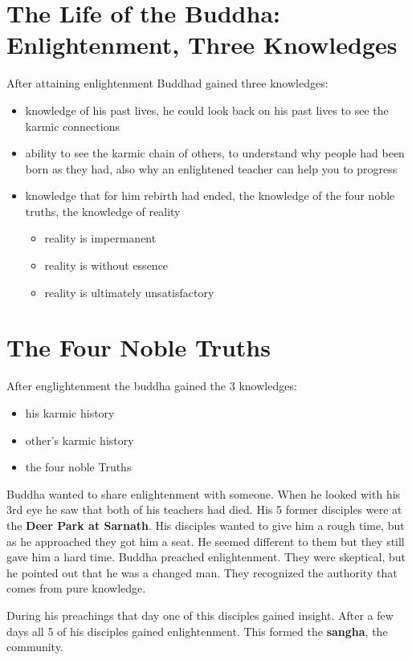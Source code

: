\documentclass{article}
\begin{document}
\section*{The Life of the Buddha: Enlightenment, Three Knowledges}
\label{sec:the_life_of_the_buddha_enlightenment_three_knowledges}
After attaining enlightenment Buddhad gained three knowledges:
\begin{itemize}
	\item knowledge of his past lives, he could look back on his past lives to see the karmic connections
	\item ability to see the karmic chain of others, to understand why people had been born as they had, also why an enlightened teacher can help you to progress
	\item knowledge that for him rebirth had ended, the knowledge of the four noble truths, the knowledge of reality
	\begin{itemize}
		\item reality is impermanent
		\item reality is without essence
		\item reality is ultimately unsatisfactory
	\end{itemize}
\end{itemize}

\section*{The Four Noble Truths}
\label{sec:the_four_nobel_truths}
After englightenment the buddha gained the 3 knowledges:
\begin{itemize}
	\item his karmic history
	\item other's karmic history
	\item the four noble Truths
\end{itemize}

Buddha wanted to share enlightenment with someone. When he looked with his 3rd eye he saw that both of his teachers had died. His 5 former disciples were at the \textbf{Deer Park at Sarnath}. His disciples wanted to give him a rough time, but as he approached they got him a seat. He seemed different to them but they still gave him a hard time. Buddha preached enlightenment. They were skeptical, but he pointed out that he was a changed man. They recognized the authority that comes from pure knowledge.

During his preachings that day one of this disciples gained insight. After a few days all 5 of his disciples gained enlightenment. This formed the \textbf{sangha}, the community.
\end{document}
